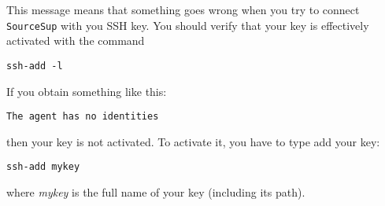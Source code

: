 \documentclass[12pt]{book}
\newcommand{\SourceSup}{\texttt{SourceSup}\xspace}
\begin{document}
This message means that something goes wrong when you try to connect \SourceSup with you SSH key. You should verify that your key is effectively activated with the command
\lstset{language=bash} 
\begin{lstlisting}
ssh-add -l
\end{lstlisting}
If you obtain something like this:
\lstset{language=bash} 
\begin{lstlisting}
The agent has no identities
\end{lstlisting}
then your key is not activated. To activate it, you have to type add your key:
\lstset{language=bash} 
\begin{lstlisting}
ssh-add mykey
\end{lstlisting}
where \textit{mykey} is the full name of your key (including its path).
\end{document}

